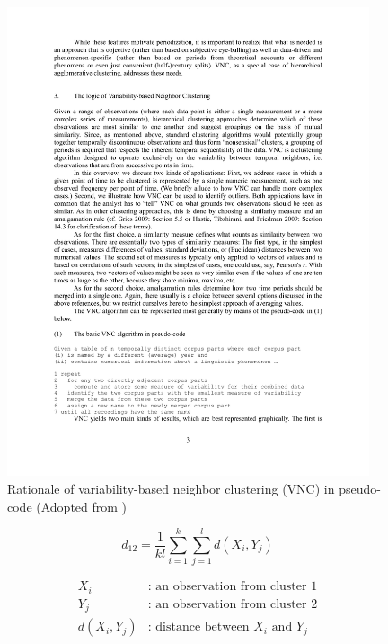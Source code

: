 \begin{figure}[H]
  \centering
  \includegraphics[width=0.95\textwidth,keepaspectratio]{figures_ref/Gries_and_Hilpert_2012_VNC_algo.pdf}
  \caption{Rationale of variability-based neighbor clustering (VNC) in pseudo-code (Adopted from \textcite{gries2012variability})}
  \label{fig:vnc_pseudocode}
\end{figure}

\begin{equation}
  d_{12} = \frac{1}{kl}\displaystyle\sum\limits_{i=1}^k {\displaystyle\sum\limits_{j=1}^l d(X_i, Y_j)}
  \label{equ:avg_linkage_func}
\end{equation}

\begin{equation*}
  \begin{aligned}
    X_i &\text{: an observation from cluster 1} \\
    Y_j &\text{: an observation from cluster 2} \\
    d(X_i, Y_j) &\text{: distance between } X_i \text{ and } Y_j
  \end{aligned}
\end{equation*}

